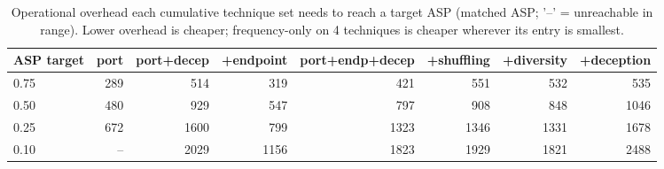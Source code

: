 \begin{table}[t]
\centering
\caption{Operational overhead each cumulative technique set needs to reach a target ASP (matched ASP; '--' = unreachable in range). Lower overhead is cheaper; frequency-only on 4 techniques is cheaper wherever its entry is smallest.}
\label{tab:c1_matched_asp}
\begin{tabular}{lrrrrrrr}
\toprule
ASP target & port & port+decep & +endpoint & port+endp+decep & +shuffling & +diversity & +deception \\
\midrule
0.75 & 289 & 514 & 319 & 421 & 551 & 532 & 535 \\
0.50 & 480 & 929 & 547 & 797 & 908 & 848 & 1046 \\
0.25 & 672 & 1600 & 799 & 1323 & 1346 & 1331 & 1678 \\
0.10 & -- & 2029 & 1156 & 1823 & 1929 & 1821 & 2488 \\
\bottomrule
\end{tabular}
\end{table}
